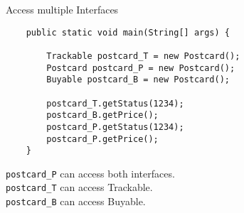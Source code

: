 \begin{frame}[fragile]{Access multiple Interfaces}
    \begin{lstlisting}
    public static void main(String[] args) {
    
        Trackable postcard_T = new Postcard();
        Postcard postcard_P = new Postcard();
        Buyable postcard_B = new Postcard();

        postcard_T.getStatus(1234);
        postcard_B.getPrice();
        postcard_P.getStatus(1234);
        postcard_P.getPrice();
    }
    \end{lstlisting}
    \texttt{postcard\_P} can access both interfaces.\\
    \texttt{postcard\_T} can access Trackable.\\
    \texttt{postcard\_B} can access Buyable.
\end{frame}
